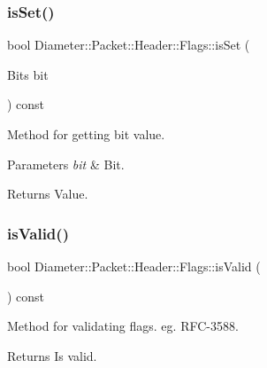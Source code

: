 \subsubsection{\texorpdfstring{is\+Set()}{isSet()}}
{\footnotesize\ttfamily bool Diameter\+::\+Packet\+::\+Header\+::\+Flags\+::is\+Set (\begin{DoxyParamCaption}\item[{Bits}]{bit }\end{DoxyParamCaption}) const}



Method for getting bit value. 


\begin{DoxyParams}{Parameters}
{\em bit} & Bit. \\
\hline
\end{DoxyParams}
\begin{DoxyReturn}{Returns}
Value. 
\end{DoxyReturn}
\mbox{\label{classDiameter_1_1Packet_1_1Header_1_1Flags_ae577fd786c656522b958395fb140dd8d}} 
\subsubsection{\texorpdfstring{is\+Valid()}{isValid()}}
{\footnotesize\ttfamily bool Diameter\+::\+Packet\+::\+Header\+::\+Flags\+::is\+Valid (\begin{DoxyParamCaption}{ }\end{DoxyParamCaption}) const}



Method for validating flags. eg. R\+F\+C-\/3588. 

\begin{DoxyReturn}{Returns}
Is valid. 
\end{DoxyReturn}
\mbox{\label{classDiameter_1_1Packet_1_1Header_1_1Flags_afd99abaebff289fdc859696929fea0da}} 
